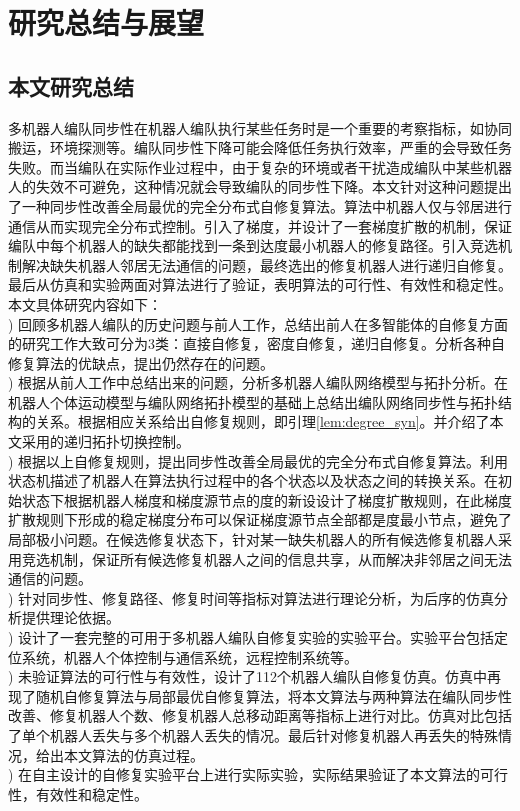 \chapter{研究总结与展望}

\section{本文研究总结}
多机器人编队同步性在机器人编队执行某些任务时是一个重要的考察指标，如协同搬运，环境探测等。编队同步性下降可能会降低任务执行效率，严重的会导致任务失败。而当编队在实际作业过程中，由于复杂的环境或者干扰造成编队中某些机器人的失效不可避免，这种情况就会导致编队的同步性下降。本文针对这种问题提出了一种同步性改善全局最优的完全分布式自修复算法。算法中机器人仅与邻居进行通信从而实现完全分布式控制。引入了梯度，并设计了一套梯度扩散的机制，保证编队中每个机器人的缺失都能找到一条到达度最小机器人的修复路径。引入竞选机制解决缺失机器人邻居无法通信的问题，最终选出的修复机器人进行递归自修复。最后从仿真和实验两面对算法进行了验证，表明算法的可行性、有效性和稳定性。本文具体研究内容如下：\\
) 回顾多机器人编队的历史问题与前人工作，总结出前人在多智能体的自修复方面的研究工作大致可分为3类：直接自修复，密度自修复，递归自修复。分析各种自修复算法的优缺点，提出仍然存在的问题。\\
) 根据从前人工作中总结出来的问题，分析多机器人编队网络模型与拓扑分析。在机器人个体运动模型与编队网络拓扑模型的基础上总结出编队网络同步性与拓扑结构的关系。根据相应关系给出自修复规则，即引理\ref{lem:degree_syn}。并介绍了本文采用的递归拓扑切换控制。\\
) 根据以上自修复规则，提出同步性改善全局最优的完全分布式自修复算法。利用状态机描述了机器人在算法执行过程中的各个状态以及状态之间的转换关系。在初始状态下根据机器人梯度和梯度源节点的度的新设设计了梯度扩散规则，在此梯度扩散规则下形成的稳定梯度分布可以保证梯度源节点全部都是度最小节点，避免了局部极小问题。在候选修复状态下，针对某一缺失机器人的所有候选修复机器人采用竞选机制，保证所有候选修复机器人之间的信息共享，从而解决非邻居之间无法通信的问题。\\
) 针对同步性、修复路径、修复时间等指标对算法进行理论分析，为后序的仿真分析提供理论依据。\\
) 设计了一套完整的可用于多机器人编队自修复实验的实验平台。实验平台包括定位系统，机器人个体控制与通信系统，远程控制系统等。\\
) 未验证算法的可行性与有效性，设计了112个机器人编队自修复仿真。仿真中再现了随机自修复算法与局部最优自修复算法，将本文算法与两种算法在编队同步性改善、修复机器人个数、修复机器人总移动距离等指标上进行对比。仿真对比包括了单个机器人丢失与多个机器人丢失的情况。最后针对修复机器人再丢失的特殊情况，给出本文算法的仿真过程。\\
) 在自主设计的自修复实验平台上进行实际实验，实际结果验证了本文算法的可行性，有效性和稳定性。

